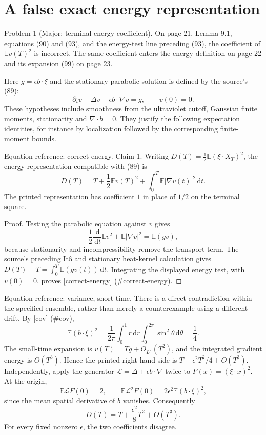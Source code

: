 \documentclass[10pt]{article}
\begin{document}
\section*{A false exact energy representation}
Problem 1 (Major: terminal energy coefficient).  On page 21, Lemma 9.1, equations (90) and (93), and the energy-test line preceding (93), the coefficient of \(\mathbb Ev(T)^2\) is incorrect. The same coefficient enters the energy definition on page 22 and its expansion (99) on page 23.\par
Here \(g=\epsilon b\cdot\xi\) and the stationary parabolic solution is defined by the source’s (89): \[\partial_t v-\Delta v-\epsilon b\cdot\nabla v=g,\qquad v(0)=0.\] These hypotheses include smoothness from the ultraviolet cutoff, Gaussian finite moments, stationarity and \(\nabla\cdot b=0\). They justify the following expectation identities, for instance by localization followed by the corresponding finite-moment bounds.\par
Equation reference: correct-energy. Claim 1.  Writing \(D(T)=\tfrac12\mathbb E(\xi\cdot X_T)^2\), the energy representation compatible with (89) is \[
 D(T)=T+\frac12\mathbb Ev(T)^2+
             \int_0^T\mathbb E|\nabla v(t)|^2\,\mathrm dt .\] The printed representation has coefficient \(1\) in place of \(1/2\) on the terminal square.\par
Proof. Testing the parabolic equation against \(v\) gives \[\frac12\frac{\,\mathrm d}{\,\mathrm dt}\mathbb Ev^2+\mathbb E|\nabla v|^2=\mathbb E(gv),\] because stationarity and incompressibility remove the transport term. The source’s preceding Itô and stationary heat-kernel calculation gives \(D(T)-T=\int_0^T\mathbb E(gv(t))\,\mathrm dt\). Integrating the displayed energy test, with \(v(0)=0\), proves [correct-energy] (\#correct-energy). ◻\par
Equation reference: variance, short-time. There is a direct contradiction within the specified ensemble, rather than merely a counterexample using a different drift. By [cov] (\#cov), \[
 \mathbb E(b\cdot\xi)^2
 =\frac1{2\pi}\int_0^1r\,\mathrm dr\int_0^{2\pi}\sin^2\theta\,\mathrm d\theta
 =\frac14.\] The small-time expansion is \(v(T)=Tg+O_{L^2}(T^2)\), and the integrated gradient energy is \(O(T^3)\). Hence the printed right-hand side is \(T+\epsilon^2T^2/4+O(T^3)\). Independently, apply the generator \(\mathcal L=\Delta+\epsilon b\cdot\nabla\) twice to \(F(x)=(\xi\cdot x)^2\). At the origin, \[\mathbb E\mathcal LF(0)=2,\qquad
 \mathbb E\mathcal L^2F(0)=2\epsilon^2\mathbb E(b\cdot\xi)^2,\] since the mean spatial derivative of \(b\) vanishes. Consequently \[
 D(T)=T+\frac{\epsilon^2}{8}T^2+O(T^3).\] For every fixed nonzero \(\epsilon\), the two coefficients disagree.\par
\end{document}

